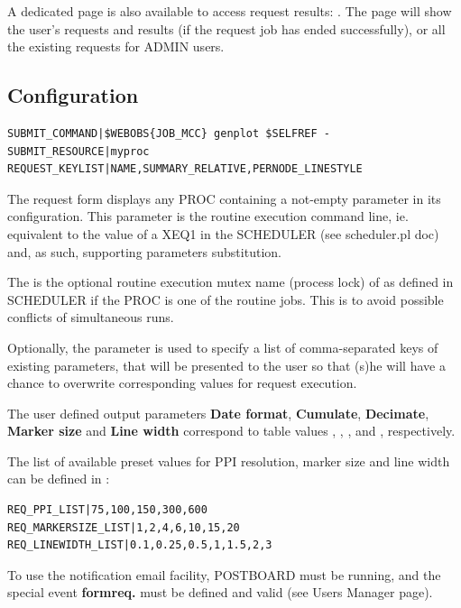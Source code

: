 A dedicated page is also available to access request results: . The page will show the user's requests and results (if the request job has ended successfully), or all the existing requests for ADMIN users.


\subsection{Configuration}

\begin{lstlisting}[title=\wofile{PROC.conf} (excerpt)]
SUBMIT_COMMAND|$WEBOBS{JOB_MCC} genplot $SELFREF -
SUBMIT_RESOURCE|myproc
REQUEST_KEYLIST|NAME,SUMMARY_RELATIVE,PERNODE_LINESTYLE
\end{lstlisting}

The request form displays any PROC containing a not-empty  parameter in its configuration. This parameter is the routine execution command line, ie. equivalent to the value of a XEQ1 in the SCHEDULER (see scheduler.pl doc) and, as such,
supporting  parameters substitution.

The  is the optional routine execution mutex name (process lock) of as defined in SCHEDULER if the PROC is one of the routine jobs. This is to avoid possible conflicts of simultaneous runs.

Optionally, the  parameter is used to specify a list of comma-separated keys of existing parameters, that will be
presented to the user so that (s)he will have a chance to overwrite corresponding values for request execution.

The user defined output parameters \textbf{Date format}, \textbf{Cumulate}, \textbf{Decimate}, \textbf{Marker size} and \textbf{Line width} correspond to table values , , ,  and , respectively.

The list of available preset values for PPI resolution, marker size and line width can be defined in  :

\begin{lstlisting}[title=\wofile{WEBOBS.rc} (excerpt)]
REQ_PPI_LIST|75,100,150,300,600
REQ_MARKERSIZE_LIST|1,2,4,6,10,15,20
REQ_LINEWIDTH_LIST|0.1,0.25,0.5,1,1.5,2,3
\end{lstlisting}

To use the notification email facility, POSTBOARD must be running, and the special event \textbf{formreq.} must be defined and valid (see \webobs Users Manager page).



